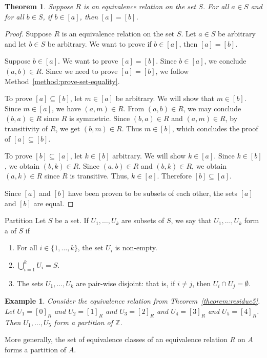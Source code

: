 \documentclass{book}
\newcounter{ekcounter}%
\theoremstyle{ekimcustom}
\newtheorem{theorem}[ekcounter]{Theorem}
\newtheorem{example}[ekcounter]{Example}
\newcommand\defn[1]{{\color{blue}{\bf #1}}}
\begin{document}
\begin{theorem}
Suppose $R$ is an equivalence relation on the set $S$. For all $a \in S$ and for all $b \in S$, if $b \in [a]$, then $[a]=[b]$.
\end{theorem}
\begin{proof}
Suppose $R$ is an equivalence relation on the set $S$. Let $a \in S$ be arbitrary and let $b \in S$ be arbitrary. We want to prove if $b \in [a]$, then $[a]=[b]$.

Suppose $b \in [a]$. We want to prove $[a]=[b]$. Since $b \in [a]$, we conclude $(a,b) \in R$. Since we need to prove $[a]=[b]$, we follow Method~\ref{method:prove-set-equality}.

To prove $[a] \subseteq [b]$, let $m \in [a]$ be arbitrary. We will show that $m \in [b]$. Since $m \in [a]$, we have $(a,m) \in R$. From $(a,b) \in R$, we may conclude $(b,a) \in R$ since $R$ is symmetric. Since $(b,a) \in R$ and $(a,m) \in R$, by transitivity of $R$, we get $(b,m) \in R$. Thus $m \in [b]$, which concludes the proof of $[a] \subseteq [b]$.

To prove $[b] \subseteq [a]$, let $k \in [b]$ arbitrary. We will show $k \in [a]$. Since $k \in [b]$, we obtain $(b,k) \in R$. Since $(a,b) \in R$ and $(b,k) \in R$, we obtain $(a,k) \in R$ since $R$ is transitive. Thus, $k \in [a]$. Therefore $[b] \subseteq [a]$.

Since $[a]$ and $[b]$ have been proven to be subsets of each other, the sets $[a]$ and $[b]$ are equal.
\end{proof}

\begin{bdefinition}{Partition}{}
Let $S$ be a set. If $U_1,\dots, U_k$ are subsets of $S$, we say that $U_1,\dots, U_k$ form a \defn{partition} of $S$ if
\begin{enumerate}
\item For all $i \in \{1,\dots, k\}$, the set $U_i$ is non-empty.
\item $\displaystyle \bigcup_{i=1}^k U_i = S$.
\item The sets $U_1,\dots, U_k$ are pair-wise disjoint: that is, if $i \not= j$, then $U_i \cap U_j = \emptyset$.
\end{enumerate}
\end{bdefinition}
\begin{example}\label{example:partition}
Consider the equivalence relation from Theorem~\ref{theorem:residue5}. 
Let 
$U_1 = [0]_R$ and 
$U_2 = [1]_R$ and 
$U_3 = [2]_R$ and 
$U_4 = [3]_R$ and 
$U_5 = [4]_R$.
Then $U_1,\dots,U_5$ form a partition of $\mathbb{Z}$.
\end{example}
More generally, the set of equivalence classes of an equivalence relation $R$ on $A$ forms a partition of $A$.
\end{document}

